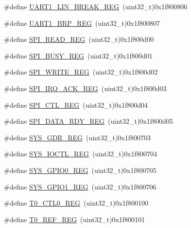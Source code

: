 \begin{DoxyCompactItemize}
\item 
\#define \mbox{\hyperlink{a00020_a6d54a0959e79da414b55c18c22811bf7}{U\+A\+R\+T1\+\_\+\+L\+I\+N\+\_\+\+B\+R\+E\+A\+K\+\_\+\+R\+EG}}~(uint32\+\_\+t)0x1f800806
\item 
\#define \mbox{\hyperlink{a00020_aeda40eeecb45bc5e18bd6c8dcbfe3e30}{U\+A\+R\+T1\+\_\+\+B\+R\+P\+\_\+\+R\+EG}}~(uint32\+\_\+t)0x1f800807
\item 
\#define \mbox{\hyperlink{a00020_a26215878d57c780dd386b9031ac9e959}{S\+P\+I\+\_\+\+R\+E\+A\+D\+\_\+\+R\+EG}}~(uint32\+\_\+t)0x1f800d00
\item 
\#define \mbox{\hyperlink{a00020_aa49afdb793572a5ee1bc9f2d92dc5c00}{S\+P\+I\+\_\+\+B\+U\+S\+Y\+\_\+\+R\+EG}}~(uint32\+\_\+t)0x1f800d01
\item 
\#define \mbox{\hyperlink{a00020_a7fa9769ae86a7da40ab899f17cec83d2}{S\+P\+I\+\_\+\+W\+R\+I\+T\+E\+\_\+\+R\+EG}}~(uint32\+\_\+t)0x1f800d02
\item 
\#define \mbox{\hyperlink{a00020_a248babd7289755884a7a2757cddf8d41}{S\+P\+I\+\_\+\+I\+R\+Q\+\_\+\+A\+C\+K\+\_\+\+R\+EG}}~(uint32\+\_\+t)0x1f800d03
\item 
\#define \mbox{\hyperlink{a00020_a511f9aae9095077d34f28a7c12a3173f}{S\+P\+I\+\_\+\+C\+T\+L\+\_\+\+R\+EG}}~(uint32\+\_\+t)0x1f800d04
\item 
\#define \mbox{\hyperlink{a00020_aaabb86836259b4d4e6583d3c5f55c8d1}{S\+P\+I\+\_\+\+D\+A\+T\+A\+\_\+\+R\+D\+Y\+\_\+\+R\+EG}}~(uint32\+\_\+t)0x1f800d05
\item 
\#define \mbox{\hyperlink{a00020_a07fb188b7660d1b438f8c2cb8e57396f}{S\+Y\+S\+\_\+\+G\+D\+R\+\_\+\+R\+EG}}~(uint32\+\_\+t)0x1f800703
\item 
\#define \mbox{\hyperlink{a00020_a43d7770fdd59d1c008b789d8e9ae882b}{S\+Y\+S\+\_\+\+I\+O\+C\+T\+L\+\_\+\+R\+EG}}~(uint32\+\_\+t)0x1f800704
\item 
\#define \mbox{\hyperlink{a00020_ac12676fdbfbffb9d4114bb751b6d4f74}{S\+Y\+S\+\_\+\+G\+P\+I\+O0\+\_\+\+R\+EG}}~(uint32\+\_\+t)0x1f800705
\item 
\#define \mbox{\hyperlink{a00020_a5bcff87fa505b928a78a15fb375a0e6f}{S\+Y\+S\+\_\+\+G\+P\+I\+O1\+\_\+\+R\+EG}}~(uint32\+\_\+t)0x1f800706
\item 
\#define \mbox{\hyperlink{a00020_ac94b0659ef32086a6752672082c0b3ed}{T0\+\_\+\+C\+T\+L0\+\_\+\+R\+EG}}~(uint32\+\_\+t)0x1f800100
\item 
\#define \mbox{\hyperlink{a00020_a857679d0d1c771053cac56dc76c38caa}{T0\+\_\+\+R\+E\+F\+\_\+\+R\+EG}}~(uint32\+\_\+t)0x1f800101
\item 

\end{DoxyCompactItemize}
